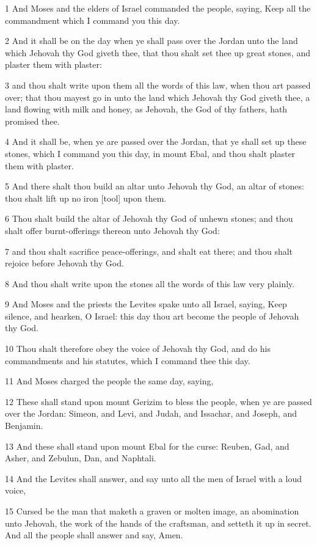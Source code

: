 \par 1 And Moses and the elders of Israel commanded the people, saying, Keep all the commandment which I command you this day.
\par 2 And it shall be on the day when ye shall pass over the Jordan unto the land which Jehovah thy God giveth thee, that thou shalt set thee up great stones, and plaster them with plaster:
\par 3 and thou shalt write upon them all the words of this law, when thou art passed over; that thou mayest go in unto the land which Jehovah thy God giveth thee, a land flowing with milk and honey, as Jehovah, the God of thy fathers, hath promised thee.
\par 4 And it shall be, when ye are passed over the Jordan, that ye shall set up these stones, which I command you this day, in mount Ebal, and thou shalt plaster them with plaster.
\par 5 And there shalt thou build an altar unto Jehovah thy God, an altar of stones: thou shalt lift up no iron [tool] upon them.
\par 6 Thou shalt build the altar of Jehovah thy God of unhewn stones; and thou shalt offer burnt-offerings thereon unto Jehovah thy God:
\par 7 and thou shalt sacrifice peace-offerings, and shalt eat there; and thou shalt rejoice before Jehovah thy God.
\par 8 And thou shalt write upon the stones all the words of this law very plainly.
\par 9 And Moses and the priests the Levites spake unto all Israel, saying, Keep silence, and hearken, O Israel: this day thou art become the people of Jehovah thy God.
\par 10 Thou shalt therefore obey the voice of Jehovah thy God, and do his commandments and his statutes, which I command thee this day.
\par 11 And Moses charged the people the same day, saying,
\par 12 These shall stand upon mount Gerizim to bless the people, when ye are passed over the Jordan: Simeon, and Levi, and Judah, and Issachar, and Joseph, and Benjamin.
\par 13 And these shall stand upon mount Ebal for the curse: Reuben, Gad, and Asher, and Zebulun, Dan, and Naphtali.
\par 14 And the Levites shall answer, and say unto all the men of Israel with a loud voice,
\par 15 Cursed be the man that maketh a graven or molten image, an abomination unto Jehovah, the work of the hands of the craftsman, and setteth it up in secret. And all the people shall answer and say, Amen.
